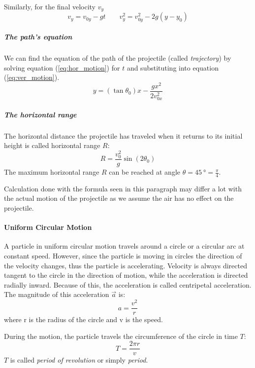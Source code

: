 Similarly, for the final velocity $v_y$
\begin{equation}
v_y = v_{0y} - gt\qquad v^2_y = v_{0y}^2 - 2g(y-y_0)
\end{equation}
\subparagraph{The path's equation} We can find the equation of the path of the projectile (called \emph{trajectory}) by solving equation (\ref{eq:hor_motion}) for $t$ and substituting into equation (\ref{eq:ver_motion}).
\begin{equation}
y = (\tan \theta_0)x - \frac{gx^2}{2v_{0x}^2}
\end{equation}
\subparagraph{The horizontal range} The horizontal distance the projectile has traveled when it returns to its initial height is called horizontal range $R$:
\begin{equation}
R = \frac{v^2_0}{g} \sin(2\theta_0)
\end{equation}
The maximum horizontal range $R$ can be reached at angle $\theta = \SI{45}{\degree}=\frac{\pi}{4}$.

Calculation done with the formula seen in this paragraph may differ a lot with the actual motion of the projectile as we assume the air has no effect on the projectile. 

\paragraph{Uniform Circular Motion} A particle in uniform circular motion travels around a circle or a circular arc at constant speed. However, since the particle is moving in circles the direction of the velocity changes, thus the particle is accelerating. Velocity is always directed tangent to the circle in the direction of motion, while the acceleration is directed radially inward. Because of this, the acceleration is called centripetal acceleration. The magnitude of this acceleration $\vec{a}$ is:
\begin{equation}
a = \frac{v^2}{r}
\end{equation}
where r is the radius of the circle and v is the speed.

During the motion, the particle travels the circumference of the circle in time $T$:
\begin{equation}
T = \frac{2\pi r}{v}
\end{equation}
$T$ is called \emph{period of revolution} or simply \emph{period}.

